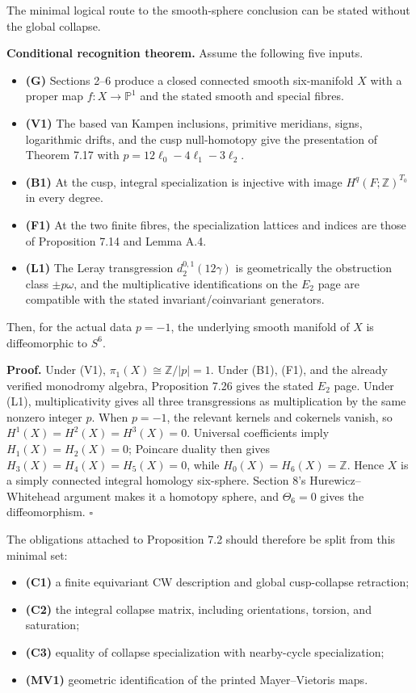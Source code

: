 \documentclass[
  10pt,
  letterpaper,
]{article}
\providecommand{\tightlist}{%
  \setlength{\itemsep}{0pt}\setlength{\parskip}{0pt}}
\begin{document}
The minimal logical route to the smooth-sphere conclusion can be stated
without the global collapse.

\textbf{Conditional recognition theorem.} Assume the following five
inputs.

\begin{itemize}
\tightlist
\item
  \textbf{(G)} Sections 2--6 produce a closed connected smooth
  six-manifold \(X\) with a proper map \(f:X\to\mathbb P^1\) and the
  stated smooth and special fibres.
\item
  \textbf{(V1)} The based van Kampen inclusions, primitive meridians,
  signs, logarithmic drifts, and the cusp null-homotopy give the
  presentation of Theorem 7.17 with \(p=12\ell_0-4\ell_1-3\ell_2\).
\item
  \textbf{(B1)} At the cusp, integral specialization is injective with
  image \(H^q(F;\mathbb Z)^{T_0}\) in every degree.
\item
  \textbf{(F1)} At the two finite fibres, the specialization lattices
  and indices are those of Proposition 7.14 and Lemma A.4.
\item
  \textbf{(L1)} The Leray transgression \(d_2^{0,1}(12\gamma)\) is
  geometrically the obstruction class \(\pm p\omega\), and the
  multiplicative identifications on the \(E_2\) page are compatible with
  the stated invariant/coinvariant generators.
\end{itemize}

Then, for the actual data \(p=-1\), the underlying smooth manifold of
\(X\) is diffeomorphic to \(S^6\).

\textbf{Proof.} Under (V1), \(\pi_1(X)\cong\mathbb Z/|p|=1\). Under
(B1), (F1), and the already verified monodromy algebra, Proposition 7.26
gives the stated \(E_2\) page. Under (L1), multiplicativity gives all
three transgressions as multiplication by the same nonzero integer
\(p\). When \(p=-1\), the relevant kernels and cokernels vanish, so
\(H^1(X)=H^2(X)=H^3(X)=0\). Universal coefficients imply
\(H_1(X)=H_2(X)=0\); Poincare duality then gives
\(H_3(X)=H_4(X)=H_5(X)=0\), while \(H_0(X)=H_6(X)=\mathbb Z\). Hence
\(X\) is a simply connected integral homology six-sphere. Section 8's
Hurewicz--Whitehead argument makes it a homotopy sphere, and
\(\Theta_6=0\) gives the diffeomorphism. \(\square\)

The obligations attached to Proposition 7.2 should therefore be split
from this minimal set:

\begin{itemize}
\tightlist
\item
  \textbf{(C1)} a finite equivariant CW description and global
  cusp-collapse retraction;
\item
  \textbf{(C2)} the integral collapse matrix, including orientations,
  torsion, and saturation;
\item
  \textbf{(C3)} equality of collapse specialization with nearby-cycle
  specialization;
\item
  \textbf{(MV1)} geometric identification of the printed Mayer--Vietoris
  maps.
\end{itemize}
\end{document}

